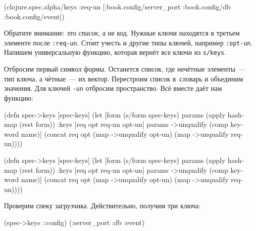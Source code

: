 \begin{english}
  \begin{clojure}
(clojure.spec.alpha/keys
 :req-un [:book.config/server_port
          :book.config/db
          :book.config/event])
  \end{clojure}
\end{english}


Обратите внимание: это \emph{список}, а не код. Нужные ключи находятся в третьем
элементе после \verb|:req-un|. Ст\'{о}ит учесть и другие типы ключей, например
\verb|:opt-un|. Напишем универсальную функцию, которая вернёт все ключи из
\verb|s/keys|.

Отбросим первый символ формы. Останется список, где нечётные элементы~--- тип ключа,
а чётные~--- их вектор. Перестроим список в~словарь и объединим значения. Для
ключей \verb|-un| отбросим пространство. Всё вместе даёт нам функцию:


\ifx\devicetype\mobile

\begin{english}
  \begin{clojure}
(defn spec->keys
  [spec-keys]
  (let [form (s/form spec-keys)
        params (apply hash-map
                 (rest form))
        {:keys [req opt req-un opt-un]}
        params
        ->unqualify (comp keyword name)]
    (concat req
            opt
            (map ->unqualify opt-un)
            (map ->unqualify req-un))))
  \end{clojure}
\end{english}

\else

\begin{english}
  \begin{clojure}
(defn spec->keys
  [spec-keys]
  (let [form (s/form spec-keys)
        params (apply hash-map (rest form))
        {:keys [req opt req-un opt-un]} params
        ->unqualify (comp keyword name)]
    (concat req
            opt
            (map ->unqualify opt-un)
            (map ->unqualify req-un))))
  \end{clojure}
\end{english}

\fi

\noindent
Проверим спеку загрузчика. Действительно, получим три ключа:

\begin{english}
  \begin{clojure}
(spec->keys ::config)
(:server_port :db :event)
  \end{clojure}
\end{english}

